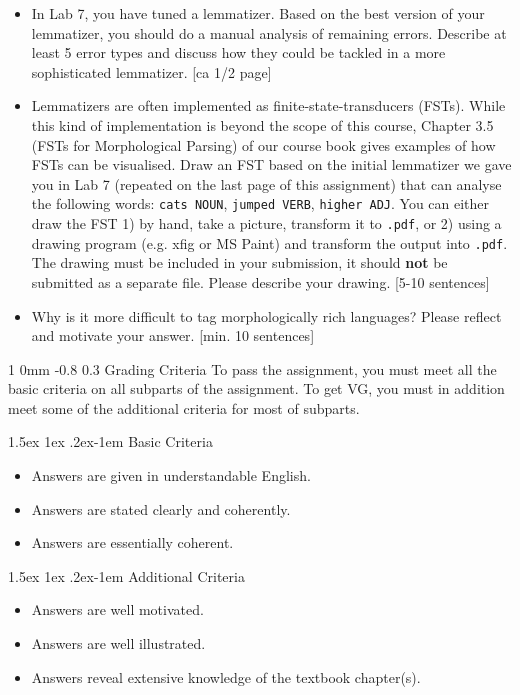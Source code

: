 \documentclass[11pt]{article}
\makeatletter
\renewcommand{\section}{\@startsection
{section}%
{1}%
{0mm}%
{-0.8\baselineskip}%
{0.3\baselineskip}%
{\bfseries\large}}%
\renewcommand{\paragraph}{%
  \@startsection{paragraph}{4}%
  {\z@}{1.5ex \@plus 1ex \@minus .2ex}{-1em}%
  {\normalfont\normalsize\bfseries}%
}\makeatother
\newenvironment{titlemize}[1]{%
    \paragraph{#1}
    \begin{itemize}
        \setlength\itemsep{0pt}}
    {\end{itemize}}
\makeatother
\begin{document}
\begin{itemize}
\item In Lab 7, you have tuned a lemmatizer. Based on the best version
  of your lemmatizer, you should do a manual analysis of remaining
  errors. Describe at least 5 error types and discuss how they could
  be tackled in a more sophisticated lemmatizer. \textcolor{UUred}{[ca
    1/2 page]}
\item Lemmatizers are often implemented as finite-state-transducers
  (FSTs). While this kind of implementation is beyond the scope of
  this course, Chapter 3.5 (FSTs for Morphological Parsing) of our
  course book gives examples of how FSTs can be visualised. Draw an
  FST based on the initial lemmatizer we gave you in Lab 7 (repeated
  on the last page of this assignment) that can analyse the following
  words: \texttt{cats NOUN}, \texttt{jumped VERB}, \texttt{higher
    ADJ}. You can either draw the FST 1) by hand, take a picture,
  transform it to \texttt{.pdf}, or 2) using a drawing program
  (e.g. xfig or MS Paint) and transform the output into
  \texttt{.pdf}. The drawing must be included in your submission, it
  should \textbf{not} be submitted as a separate file. Please describe
  your drawing. \textcolor{UUred}{[5-10 sentences]}
\item Why is it more difficult to tag morphologically rich languages?
  Please reflect and motivate your answer. \textcolor{UUred}{[min. 10
    sentences]}
\end{itemize}

\clearpage
\section{Grading Criteria}
To pass the assignment, you must meet all the basic criteria on all
subparts of the assignment.  To get VG, you must in addition meet some
of the additional criteria for most of subparts.

\begin{titlemize}{Basic Criteria}
    \item Answers are given in understandable English.
    \item Answers are stated clearly and coherently.
    \item Answers are essentially coherent.
\end{titlemize}
\begin{titlemize}{Additional Criteria}
    \item Answers are well motivated.
    \item Answers are well illustrated.
    \item Answers reveal extensive knowledge of the textbook chapter(s).
\end{titlemize}
\end{document}
